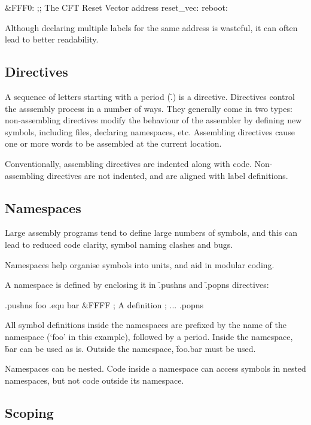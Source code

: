 \begin{cftasmcode}
&FFF0:       ;; The CFT Reset Vector address
reset_vec:
reboot:
\end{cftasmcode}

Although declaring multiple labels for the same address is wasteful, it can
often lead to better readability.

\subsection{Directives}

A sequence of letters starting with a period (\f{.}) is a directive. Directives
control the asssembly process in a number of ways. They generally come in two
types: non-assembling directives modify the behaviour of the assembler by
defining new symbols, including files, declaring namespaces, etc. Assembling
directives cause one or more words to be assembled at the current location.

Conventionally, assembling directives are indented along with
code. Non-assembling directives are not indented, and are aligned with label
definitions.

\subsection{Namespaces}

Large assembly programs tend to define large numbers of symbols, and
this can lead to reduced code clarity, symbol naming clashes and bugs.

Namespaces help organise symbols into units, and aid in modular coding.

A namespace is defined by enclosing it in \f{.pushns} and \f{.popns}
directives:

\begin{cftasmcode}
.pushns foo
.equ bar &FFFF ; A definition
; ...
.popns
\end{cftasmcode}

All symbol definitions inside the namespaces are prefixed by the name
of the namespace (‘foo’ in this example), followed by a period. Inside
the namespace, \f{bar} can be used as is. Outside the namespace,
\f{foo.bar} must be used.

Namespaces can be nested. Code inside a namespace can access symbols
in nested namespaces, but not code outside its namespace.

\subsection{Scoping}


